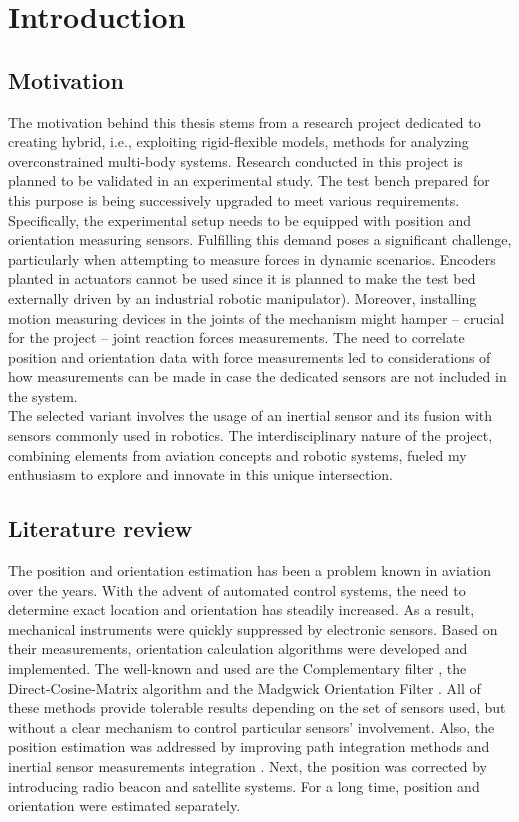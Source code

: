 \chapter{Introduction}

\section{Motivation}

The motivation behind this thesis stems from a research project dedicated to creating hybrid, i.e., exploiting rigid-flexible models, methods for analyzing overconstrained multi-body systems. Research conducted in this project is planned to be validated in an experimental study. The test bench prepared for this purpose is being successively upgraded to meet various requirements. Specifically, the experimental setup needs to be equipped with position and orientation measuring sensors. Fulfilling this demand poses a significant challenge, particularly when attempting to measure forces in dynamic scenarios. Encoders planted in actuators cannot be used since it is planned to make the test bed externally driven by an industrial robotic manipulator). Moreover, installing motion measuring devices in the joints of the mechanism might hamper -- crucial for the project -- joint reaction forces measurements. The need to correlate position and orientation data with force measurements led to considerations of how measurements can be made in case the dedicated sensors are not included in the system.\\

The selected variant involves the usage of an inertial sensor and its fusion with sensors commonly used in robotics. The interdisciplinary nature of the project, combining elements from aviation concepts and robotic systems, fueled my enthusiasm to explore and innovate in this unique intersection.

\newpage
\section{Literature review}

The position and orientation estimation has been a problem known in aviation over the years. With the advent of automated control systems, the need to determine exact location and orientation has steadily increased. As a result, mechanical instruments were quickly suppressed by electronic sensors. Based on their measurements, orientation calculation algorithms were developed and implemented. The well-known and used are the Complementary filter \cite{complementary}, the Direct-Cosine-Matrix algorithm \cite{dcm} and the Madgwick Orientation Filter \cite{madgwick} \cite{Hasan2020}. All of these methods provide tolerable results depending on the set of sensors used, but without a clear mechanism to control particular sensors' involvement.
Also, the position estimation was addressed by improving path integration methods and inertial sensor measurements integration \cite{farrell2012integrated}. Next, the position was corrected by introducing radio beacon and satellite systems. For a long time, position and orientation were estimated separately.\\

